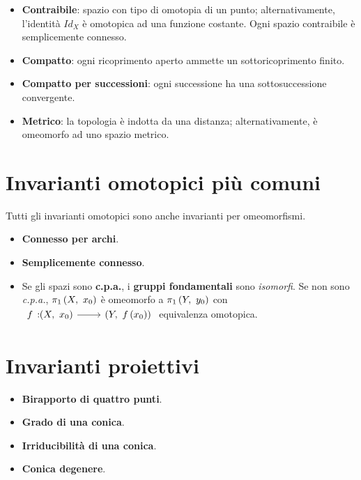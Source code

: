 \begin{multicols}{2}
\begin{itemize}
	\item \textbf{Contraibile}: spazio con tipo di omotopia di un punto; alternativamente, l'identità $Id_X$ è omotopica ad una funzione costante. Ogni spazio contraibile è semplicemente connesso.
\end{itemize}
\textls{\textsc{\textcolor{reddo}{Compattezza}}}
\begin{itemize}
	\item \textbf{Compatto}: ogni ricoprimento aperto ammette un sottoricoprimento finito.
	\item \textbf{Compatto per successioni}: ogni successione ha una sottosuccessione convergente.
\end{itemize}
\textls{\textsc{\textcolor{reddo}{Metrica}}}
\begin{itemize}
	\item \textbf{Metrico}: la topologia è indotta da una distanza; alternativamente, è omeomorfo ad uno spazio metrico.
\end{itemize}
\end{multicols}
\section{Invarianti omotopici più comuni}
Tutti gli invarianti omotopici sono anche invarianti per omeomorfismi.
\begin{multicols}{2}
\begin{itemize}
	\item \textbf{Connesso per archi}.
	\item \textbf{Semplicemente connesso}.
	\item Se gli spazi sono \textbf{c.p.a.}, i \textbf{gruppi fondamentali} sono \textit{isomorfi}. Se non sono \textit{c.p.a.}, $\gruf{X}{x_0}$ è omeomorfo a $\gruf{Y}{y_0}$ con $\funz{f}{\left(X,\ x_0\right)}{\left(Y,\ f\left(x_0\right)\right)}$ equivalenza omotopica.
\end{itemize}
\end{multicols}
\section{Invarianti proiettivi}
\begin{multicols}{2}
\begin{itemize}
	\item \textbf{Birapporto di quattro punti}.
	\item \textbf{Grado di una conica}.
	\item \textbf{Irriducibilità di una conica}.
	\item \textbf{Conica degenere}.
\end{itemize}	
\end{multicols}